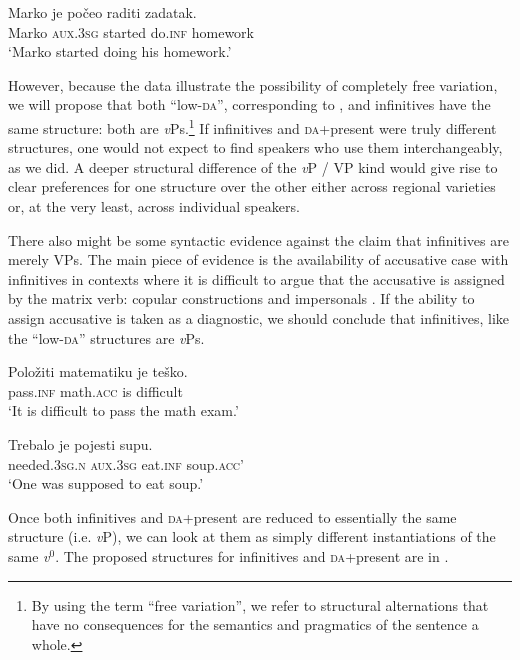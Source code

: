 \documentclass[output=paper,
modfonts,
newtxmath,
hidelinks,
]{langscibook}
\begin{document}
\ea \label{ex11}
\gll Marko je počeo raditi zadatak.\\
     Marko \textsc{aux.3sg} started do.\textsc{inf} homework\\
\glt `Marko started doing his homework.'
\z

\noindent However, because the data illustrate the possibility of completely free variation, we will propose that both ``low-\textsc{da}'', corresponding to , and infinitives have the same structure: both are \textit{v}Ps.\footnote{\label{fn4}By using the term ``free variation'', we refer to structural alternations that have no consequences for the semantics and pragmatics of the sentence a whole.}  If infinitives and \textsc{da}+present were truly different structures, one would not expect to find speakers who use them interchangeably, as we did. A deeper structural difference of the \textit{v}P / VP kind would give rise to clear preferences for one structure over the other either across regional varieties or, at the very least, across individual speakers.

There also might be some syntactic evidence against the claim that infinitives are merely VPs. The main piece of evidence is the availability of accusative case with infinitives in contexts where it is difficult to argue that the accusative is assigned by the matrix verb: copular constructions  and impersonals . If the ability to assign accusative is taken as a diagnostic, we should conclude that infinitives, like the ``low-\textsc{da}'' structures are \textit{v}Ps.

\ea \label{ex12}
\gll Položiti matematiku je teško.\\
     pass.\textsc{inf} math.\textsc{acc} is difficult\\
\glt `It is difficult to pass the math exam.'
\z

\ea \label{ex13}
\gll Trebalo je pojesti supu.\\
     needed.\textsc{3sg.n} \textsc{aux.3sg} eat.\textsc{inf} soup.\textsc{acc}'\\
\glt `One was supposed to eat soup.'
\z

\noindent Once both infinitives and \textsc{da}+present are reduced to essentially the same structure (i.e. \textit{v}P), we can look at them as simply different instantiations of the same \textit{v$^0$}. The proposed structures for infinitives and \textsc{da}+present are in .\largerpage[-1]
\end{document}
